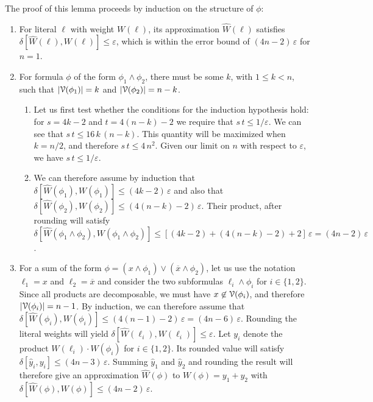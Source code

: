 \documentclass[letterpaper,USenglish,cleveref, autoref, thm-restate]{lipics-v2021}
\newcommand{\obar}[1]{\overline{#1}}
\newcommand{\lit}{\ell}
\newcommand{\approximate}[1]{\hat{#1}}
\newcommand{\approxy}{\approximate{y}}
\newcommand{\approxW}{\approximate{W}}
\newcommand{\aerror}{\delta}
\newcommand{\roundepsilon}{\varepsilon}
\newcommand{\dependencyset}{{\cal V}}
\begin{document}
The proof of this lemma proceeds by induction on the structure of $\phi$:
\begin{enumerate}
\item For literal $\lit$ with weight $W(\lit)$, its approximation $\approxW(\lit)$ satisfies
$\aerror[\approxW(\lit), W(\lit)] \leq \roundepsilon$, which is within the error bound of $(4n-2)\,\roundepsilon$ for $n=1$.
\item For formula $\phi$ of the form $\phi_1 \land \phi_2$, there must be some $k$, with $1 \leq k < n$, such that $|\dependencyset(\phi_1)| = k$
  and $|\dependencyset(\phi_2)| = n-k$.
\begin{enumerate}
  \item Let us first test whether the conditions for the induction hypothesis hold: for $s = 4k-2$ and $t = 4(n-k)-2$
    we require that $s\,t \leq 1/\roundepsilon$.  We can see that $s\,t \leq 16\,k\,(n-k)$. This quantity will be maximized when $k = n/2$,
    and therefore $s \, t \leq 4\,n^2$.
    Given our limit on $n$ with respect to $\roundepsilon$, we have $s \, t \leq 1/\roundepsilon$.
  \item
We can therefore assume by induction that 
 $\aerror[\approxW(\phi_1), W(\phi_1)] \leq (4 k-2) \,\roundepsilon$
  and also that $\aerror[\approxW(\phi_2), W(\phi_2)] \leq (4 (n-k)-2) \,\roundepsilon$.  Their product, after rounding
  will satisfy 
$\aerror[\approxW(\phi_1 \land \phi_2), W(\phi_1 \land \phi_2)] \leq [(4 k -2) + (4 (n-k) -2) + 2]\,\roundepsilon = (4n-2) \,\roundepsilon$.
\end{enumerate}
\item For a sum of the form
  $\phi = (x \land \phi_1) \lor (\obar{x} \land \phi_2)$, let us use the notation $\lit_1 = x$ and $\lit_2 = \obar{x}$
  and consider the two subformulas $\lit_i \land \phi_i$ for $i \in \{1,2\}$.
  Since all products are decomposable, we must have $x \not \in \dependencyset(\phi_i)$,
  and therefore $|\dependencyset(\phi_i)| = n-1$.
  By induction, we can therefore assume that
  $\aerror[\approxW(\phi_i), W(\phi_i)] \leq (4(n-1)-2) \,\roundepsilon = (4n-6)\,\roundepsilon$.  Rounding the literal weights will yield
  $\aerror[\approxW(\lit_i), W(\lit_i)] \leq \roundepsilon$.  Let $y_i$ denote the product $W(\lit_i) \cdot W(\phi_i)$ for $i \in \{1,2\}$.
  Its rounded value will satisfy
  $\aerror[\approxy_i, y_i] \leq (4n-3) \,\roundepsilon$.  Summing $\approxy_1$ and $\approxy_2$ and rounding the result will therefore give
  an approximation $\approxW(\phi)$ to $W(\phi) = y_1 + y_2$ with
$\aerror[\approxW(\phi), W(\phi)] \leq (4n-2)\,\roundepsilon$.  
\end{enumerate}
\end{document}
